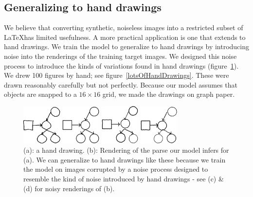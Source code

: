 \documentclass{article}
\begin{document}
\subsection{Generalizing to hand drawings}
We believe that converting synthetic, noiseless images into a restricted subset of
\LaTeX has limited usefulness.  A more practical
application is one that extends to hand drawings.  We train the model
to generalize to hand drawings by introducing noise into the
renderings of the training target images.
We designed this noise process to introduce the kinds of variations found in hand drawings (figure~\ref{handDrawingExamples}).
We drew 100 figures by hand; see figure~\ref{lotsOfHandDrawings}.
These were drawn reasonably carefully but not perfectly.
Because our model assumes that objects are snapped to a $16\times 16$ grid,
we made the drawings on graph paper.
\begin{figure}[H]%
  \begin{minipage}[t]{0.2\textwidth}\includegraphics[width = 2cm]{figures/expert-60-reduced.png}
    \subcaption{}
  \end{minipage}%
   \begin{minipage}[t]{0.2\textwidth}\includegraphics[width = 2cm]{figures/60-groundTruth-reduced.png}
    \subcaption{}
  \end{minipage}%
  \begin{minipage}[t]{0.2\textwidth}\includegraphics[width = 2cm]{figures/60-1-reduced.png}
    \subcaption{}
  \end{minipage}%
  \begin{minipage}[t]{0.2\textwidth}\includegraphics[width = 2cm]{figures/60-2-reduced.png} 
    \subcaption{}
  \end{minipage}
  \caption{(a): a hand drawing. (b): Rendering of the parse our model infers for (a). We can generalize to hand drawings like these because we train the model on images corrupted by a noise process designed to resemble the kind of noise introduced by hand drawings - see (c) \& (d) for noisy renderings of (b).}\label{handDrawingExamples}
\end{figure}
\end{document}
